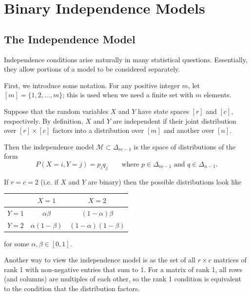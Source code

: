 \documentclass[11pt,titlepage]{article}
\newcommand*{\Mod}{\mathcal{M}}
\numberwithin{equation}{section}
\begin{document}
\section{Binary Independence Models}


\subsection{The Independence Model}
    Independence conditions arise naturally in many statistical questions.
    Essentially, they allow portions of a model to be considered separately.

    First, we introduce some notation.  For any positive integer $m$, let $[m] =
    \{1, 2, \ldots, m\}$; this is used when we need a finite set with $m$
    elements.

    Suppose that the random variables $X$ and $Y$ have state spaces $[r]$ and
    $[c]$, respectively.  By definition, $X$ and $Y$ are independent if their
    joint distribution over $[r] \times [c]$ factors into a distribution over
    $[m]$ and another over $[n]$.  
    
    Then the independence model $\Mod \subset \Delta_{rc - 1}$ is the space of
    distributions of the form
    \[
        P(X = i, Y = j) = p_i q_j
        \qquad
        \text{where $p \in \Delta_{m-1}$ and $q \in \Delta_{n-1}$}.
    \]
    \begin{example}
    If $r = c = 2$ (i.e. if $X$ and $Y$ are binary) then the possible
    distributions look like
    \begin{center}
    \begin{tabular}{l|cc}
    & $X = 1$ & $X = 2$\\
    \hline
    $Y = 1$ & $\alpha\beta$ & $(1-\alpha)\beta$\\
    $Y = 2$ & $\alpha(1-\beta)$ & $(1-\alpha)(1-\beta)$
    \end{tabular}
    \end{center}
    for some $\alpha, \beta \in [0,1]$.  
    \end{example}

    Another way to view the independence model is as the set of all $r\times c$
    matrices of rank 1 with non-negative entries that sum to 1.  For a matrix of
    rank 1, all rows (and columns) are multiples of each other, so the rank 1
    condition is equivalent to the condition that the distribution factors.
    
\end{document}
